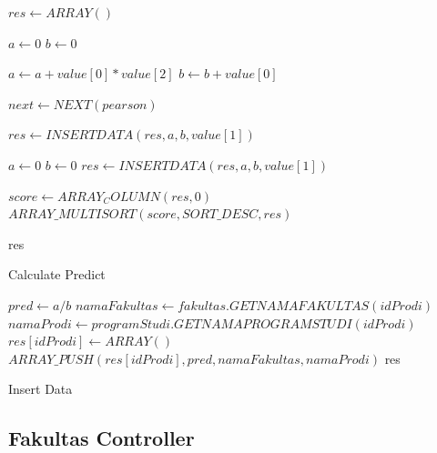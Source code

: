 \begin{algorithm}[H]
  \begin{algorithmic}[1]
        \State $res \gets ARRAY()$
        
        \State $a \gets 0$ 
        \State $b \gets 0$ 
        
            \State $a \gets a + value[0]*value[2]$
            \State $b \gets b + value[0]$
            
            \State $next \gets NEXT(pearson)$
            
                    \State $res \gets INSERTDATA(res, a, b, value[1])$
                    
                    \State $a \gets 0$
                    \State $b \gets 0$
                \EndIf
                \State $res \gets INSERTDATA(res, a, b, value[1])$
            \EndIf
        \EndFor
        
        \State $score \gets ARRAY_COLUMN(res,0)$ 
        \State $ARRAY\_MULTISORT(score, SORT\_DESC, res)$ 
        
        \State \Return res
    \EndProcedure
  \end{algorithmic} 
  \caption{Calculate Predict}
  \label{alg:calculatePredict}
\end{algorithm}

\begin{algorithm}[H]
  \begin{algorithmic}[1]
        \State $pred \gets a/b$
        \State $namaFakultas \gets fakultas.GETNAMAFAKULTAS(idProdi)$
        \State $namaProdi \gets programStudi.GETNAMAPROGRAMSTUDI(idProdi)$
        \State $res[idProdi] \gets ARRAY()$
        \State $ARRAY\_PUSH(res[idProdi], pred, namaFakultas, namaProdi)$
        \State \Return res
    \EndProcedure
  \end{algorithmic} 
  \caption{Insert Data}
  \label{alg:insertData prediction}
\end{algorithm}

\subsection{Fakultas Controller}
\label{subsec:fakultas controller}

